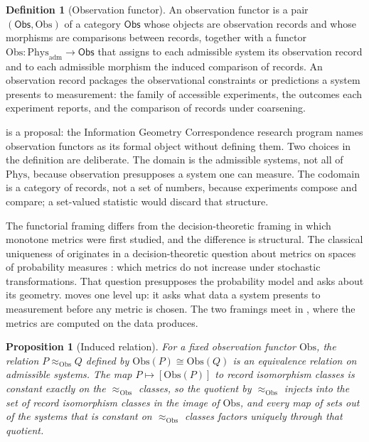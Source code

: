 \documentclass[11pt,letterpaper]{article}
\newtheorem{proposition}[theorem]{Proposition}
\theoremstyle{definition}
\newtheorem{definition}[theorem]{Definition}
\theoremstyle{remark}
\begin{document}
\begin{definition}[Observation functor]
\label{def:obs}
An observation functor is a pair $(\mathsf{Obs}, \mathrm{Obs})$ of a category $\mathsf{Obs}$ whose objects are observation records and whose morphisms are comparisons between records, together with a functor $\mathrm{Obs} \colon \mathrm{Phys}_{\mathrm{adm}} \to \mathsf{Obs}$ that assigns to each admissible system its observation record and to each admissible morphism the induced comparison of records. An observation record packages the observational constraints or predictions a system presents to measurement: the family of accessible experiments, the outcomes each experiment reports, and the comparison of records under coarsening.
\end{definition}

 is a proposal: the Information Geometry Correspondence research program names observation functors as its formal object without defining them. Two choices in the definition are deliberate. The domain is the admissible systems, not all of $\mathrm{Phys}$, because observation presupposes a system one can measure. The codomain is a category of records, not a set of numbers, because experiments compose and compare; a set-valued statistic would discard that structure.

The functorial framing differs from the decision-theoretic framing in which monotone metrics were first studied, and the difference is structural. The classical uniqueness of  originates in a decision-theoretic question about metrics on spaces of probability measures \cite{b8}: which metrics do not increase under stochastic transformations. That question presupposes the probability model and asks about its geometry.  moves one level up: it asks what data a system presents to measurement before any metric is chosen. The two framings meet in , where the metrics are computed on the data  produces.

\begin{proposition}[Induced relation]
\label{prop:equivrel}
For a fixed observation functor $\mathrm{Obs}$, the relation $P \approx_{\mathrm{Obs}} Q$ defined by $\mathrm{Obs}(P) \cong \mathrm{Obs}(Q)$ is an equivalence relation on admissible systems. The map $P \mapsto [\mathrm{Obs}(P)]$ to record isomorphism classes is constant exactly on the $\approx_{\mathrm{Obs}}$ classes, so the quotient by $\approx_{\mathrm{Obs}}$ injects into the set of record isomorphism classes in the image of $\mathrm{Obs}$, and every map of sets out of the systems that is constant on $\approx_{\mathrm{Obs}}$ classes factors uniquely through that quotient.
\end{proposition}
\end{document}
